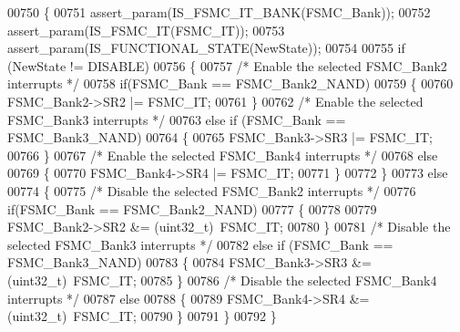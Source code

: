\begin{DoxyCode}
00750 \{
00751   assert_param(IS_FSMC_IT_BANK(FSMC\_Bank));
00752   assert_param(IS_FSMC_IT(FSMC\_IT));    
00753   assert_param(IS_FUNCTIONAL_STATE(NewState));
00754   
00755   \textcolor{keywordflow}{if} (NewState != DISABLE)
00756   \{
00757     \textcolor{comment}{/* Enable the selected FSMC\_Bank2 interrupts */}
00758     \textcolor{keywordflow}{if}(FSMC\_Bank == FSMC_Bank2_NAND)
00759     \{
00760       FSMC_Bank2->SR2 |= FSMC\_IT;
00761     \}
00762     \textcolor{comment}{/* Enable the selected FSMC\_Bank3 interrupts */}
00763     \textcolor{keywordflow}{else} \textcolor{keywordflow}{if} (FSMC\_Bank == FSMC_Bank3_NAND)
00764     \{
00765       FSMC_Bank3->SR3 |= FSMC\_IT;
00766     \}
00767     \textcolor{comment}{/* Enable the selected FSMC\_Bank4 interrupts */}
00768     \textcolor{keywordflow}{else}
00769     \{
00770       FSMC_Bank4->SR4 |= FSMC\_IT;    
00771     \}
00772   \}
00773   \textcolor{keywordflow}{else}
00774   \{
00775     \textcolor{comment}{/* Disable the selected FSMC\_Bank2 interrupts */}
00776     \textcolor{keywordflow}{if}(FSMC\_Bank == FSMC_Bank2_NAND)
00777     \{
00778       
00779       FSMC_Bank2->SR2 &= (uint32\_t)~FSMC\_IT;
00780     \}
00781     \textcolor{comment}{/* Disable the selected FSMC\_Bank3 interrupts */}
00782     \textcolor{keywordflow}{else} \textcolor{keywordflow}{if} (FSMC\_Bank == FSMC_Bank3_NAND)
00783     \{
00784       FSMC_Bank3->SR3 &= (uint32\_t)~FSMC\_IT;
00785     \}
00786     \textcolor{comment}{/* Disable the selected FSMC\_Bank4 interrupts */}
00787     \textcolor{keywordflow}{else}
00788     \{
00789       FSMC_Bank4->SR4 &= (uint32\_t)~FSMC\_IT;    
00790     \}
00791   \}
00792 \}
\end{DoxyCode}

